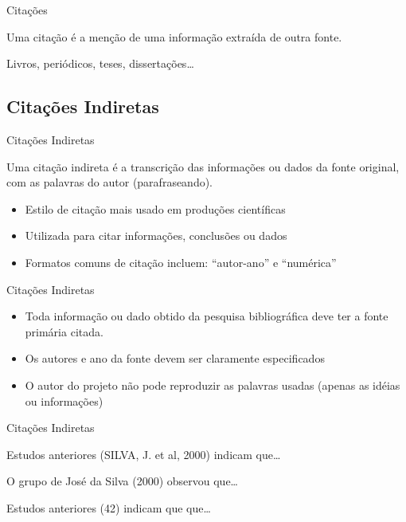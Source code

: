 \documentclass{beamer}
\begin{document}
\begin{frame}{Citações}
  \begin{definition}
    Uma citação é a menção de uma informação extraída de outra fonte.
  \end{definition}
  \begin{example}
    Livros, periódicos, teses, dissertações\ldots
  \end{example}
\end{frame}

\subsection{Citações Indiretas}

\begin{frame}{Citações Indiretas}
  \begin{definition}
    Uma citação indireta é a transcrição das informações ou dados da
    fonte original, com as palavras do autor (parafraseando).
  \end{definition}
  \begin{itemize}
  \item Estilo de citação mais usado em produções científicas
  \item Utilizada para citar informações, conclusões ou dados
  \item Formatos comuns de citação incluem: ``autor-ano'' e
    ``numérica''
  \end{itemize}
\end{frame}

\begin{frame}{Citações Indiretas}
  \begin{itemize}
  \item \alert{Toda} informação ou dado obtido da pesquisa
    bibliográfica \alert{deve} ter a fonte primária citada.
  \item Os autores e ano da fonte devem ser claramente especificados
  \item O autor do projeto \alert{não pode} reproduzir as palavras
    usadas (apenas as idéias ou informações)
  \end{itemize}
\end{frame}

\begin{frame}{Citações Indiretas}
  \begin{example}
    Estudos anteriores \alert{(SILVA, J. et al, 2000)} indicam
    que\ldots
  \end{example}
  \begin{example}
    O grupo de José da Silva \alert{(2000)} observou que\ldots
  \end{example}
  \begin{example}
    Estudos anteriores \alert{(42)} indicam que que\ldots
  \end{example}
\end{frame}
\end{document}
